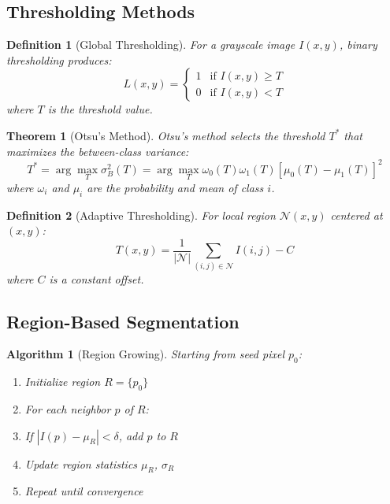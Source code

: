 \documentclass[a4paper, 11pt]{article}
\newtheorem{definition}{Definition}[section]
\newtheorem{theorem}{Theorem}[section]
\newtheorem{algorithm_def}{Algorithm}[section]
\begin{document}
\subsection{Thresholding Methods}

\begin{definition}[Global Thresholding]
For a grayscale image $I(x,y)$, binary thresholding produces:
\begin{equation}
L(x,y) = \begin{cases}
1 & \text{if } I(x,y) \geq T \\
0 & \text{if } I(x,y) < T
\end{cases}
\end{equation}
where $T$ is the threshold value.
\end{definition}

\begin{theorem}[Otsu's Method]
Otsu's method selects the threshold $T^*$ that maximizes the between-class variance:
\begin{equation}
T^* = \arg\max_{T} \sigma_B^2(T) = \arg\max_{T} \omega_0(T) \omega_1(T) [\mu_0(T) - \mu_1(T)]^2
\end{equation}
where $\omega_i$ and $\mu_i$ are the probability and mean of class $i$.
\end{theorem}

\begin{definition}[Adaptive Thresholding]
For local region $\mathcal{N}(x,y)$ centered at $(x,y)$:
\begin{equation}
T(x,y) = \frac{1}{|\mathcal{N}|} \sum_{(i,j) \in \mathcal{N}} I(i,j) - C
\end{equation}
where $C$ is a constant offset.
\end{definition}

\subsection{Region-Based Segmentation}

\begin{algorithm_def}[Region Growing]
Starting from seed pixel $p_0$:
\begin{enumerate}
\item Initialize region $R = \{p_0\}$
\item For each neighbor $p$ of $R$:
\item If $|I(p) - \mu_R| < \delta$, add $p$ to $R$
\item Update region statistics $\mu_R$, $\sigma_R$
\item Repeat until convergence
\end{enumerate}
\end{algorithm_def}
\end{document}
